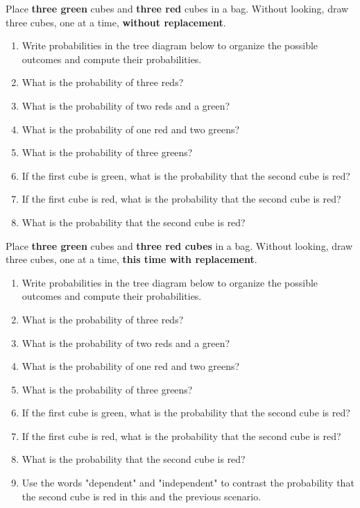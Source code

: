\documentclass[nooutcomes]{ximera}
\begin{document}
\begin{problem}
Place \textbf{three green} cubes and \textbf{three red} cubes in a bag.  Without looking, draw three cubes, one at a time, \textbf{without replacement}.  
\begin{enumerate}
\item Write probabilities in the tree diagram below to organize the possible outcomes and compute their probabilities.  
\vspace{.15in}
\item What is the probability of three reds? 
\item What is the probability of two reds and a green? 
\item What is the probability of one red and two greens? 
\item What is the probability of three greens? 
\item If the first cube is green, what is the probability that the second cube is red? 
\item If the first cube is red, what is the probability that the second cube is red? 
\item What is the probability that the second cube is red?  
\end{enumerate}
\end{problem}

\newpage
\begin{problem}
Place \textbf{three green} cubes and \textbf{three red cubes} in a bag.  Without looking, draw three cubes, one at a time, \textbf{this time with replacement}.  
\begin{enumerate}
\item Write probabilities in the tree diagram below to organize the possible outcomes and compute their probabilities.  
\vspace{.15in}
\item What is the probability of three reds? 
\item What is the probability of two reds and a green? 
\item What is the probability of one red and two greens? 
\item What is the probability of three greens? 
\item If the first cube is green, what is the probability that the second cube is red? 
\item If the first cube is red, what is the probability that the second cube is red? 
\item What is the probability that the second cube is red?  
\item Use the words "dependent" and "independent" to contrast the probability that the second cube is red in this and the previous scenario.  
\end{enumerate}
\end{problem}
\end{document}
